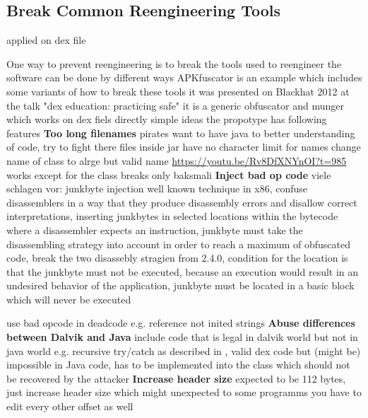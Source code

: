 \subsection{Break Common Reengineering Tools}
\label{subsection:counter-reengineering-break}

applied on dex file

One way to prevent reengineering is to break the tools used to reengineer the software
can be done by different ways
APKfuscator\cite{githubApkfuscator} is an example which includes some variants of how to break these tools
it was presented on Blackhat 2012 at the talk "dex education: practicing safe"\cite{safedexVideo} \cite{safedexSlides}
it is a generic obfuscator and munger which works on dex fiels directly
simple ideas
the propotype has following features
\newline
\newline
\textbf{Too long filenames} \newline
pirates want to have java to better understanding of code, try to fight there
files inside jar have no character limit for names
change name of class to alrge but valid name
\url{https://youtu.be/Rv8DfXNYnOI?t=985} works except for the class\newline
breaks only baksmali
\newline
\newline
\textbf{Inject bad op code} \newline
%
viele schlagen vor:
junkbyte injection
well known technique in x86, confuse disassemblers in a way that they produce disassembly errors and disallow correct interpretations, inserting junkbytes in selected locations within the bytecode where a disassembler expects an instruction, junkbyte must take the disassembling strategy into account in order to reach a maximum of obfuscated code, break the two disassebly stragien from 2.4.0, condition for the location is that the junkbyte must not be executed, because an execution would result in an undesired behavior of the application,  junkbyte must be located in a basic block which will never be executed
\cite{schulzLabCourse}
%

use bad opcode in deadcode \newline
e.g. reference not inited strings \cite{safedexSlides}
\newline
\newline
\textbf{Abuse differences between Dalvik and Java} \newline
include code that is legal in dalvik world but not in java world
e.g. recursive try/catch as described in \cite{safedexSlides}, valid dex code but (might be) impossible in Java code, has to be implemented into the class which should not be recovered by the attacker
\newline
\newline
\textbf{Increase header size} \newline
expected to be 112 bytes, just increase header size which might unexpected to some programms
you have to edit every other offset as well\newline
